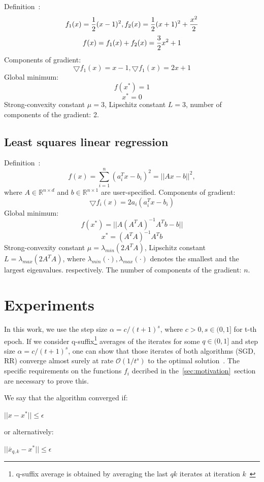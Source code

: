 \documentclass[10pt,conference,compsocconf]{IEEEtran}
\begin{document}
\noindent Definition~\cite{COMPONENTFUNCTION}:
$$f_1(x) = {1 \over 2}(x-1)^2, f_2(x) = {1 \over 2}(x+1)^2 + {x^2 \over 2}$$
$$f(x) = f_1(x) + f_2(x) = {3 \over 2} x^2 + 1$$
Components of gradient:
$$\bigtriangledown f_1(x) = x - 1, \bigtriangledown f_1(x) = 2x + 1$$
Global minimum:
$$f(x^*) = 1$$
$$x^* = 0$$
Strong-convexity constant $\mu = 3$, Lipschitz constant \mbox{$L=3$},
number of components of the gradient: 2.

\subsection{Least squares linear regression}

\noindent Definition~\cite{REGRESSION}:
$$f(x) = \sum_{i=1}^n (a_i^T x-b_i)^2 = ||Ax-b||^2,$$
\noindent where $A \in \mathbb{R}^{n \times d}$ and $b \in \mathbb{R}^{n
\times 1}$ are user-specified.
Components of gradient:
$$\bigtriangledown f_i(x) = 2 a_i(a_i^T x - b_i)$$
Global minimum:
$$f(x^*) = ||A (A^T A)^{-1} A^T b - b||$$
$$x^* = (A^T A)^{-1} A^T b$$
Strong-convexity constant $\mu = \lambda_{min}(2A^TA)$, Lipschitz constant
\mbox{$L=\lambda_{max}(2A^TA)$}, where $\lambda_{min}(\cdot),
\lambda_{max}(\cdot)$ denotes the smallest and the largest
eigenvalues. respectively. The number of components of the gradient: $n$.


\section{Experiments}


\medskip

In this work, we use the step size $\alpha = c / (t+1)^s$, where $c>0, s \in
(0, 1]$ for t-th epoch. If we consider q-suffix\footnote{q-suffix
average is obtained by averaging the last $qk$ iterates at iteration
$k$~\cite{COMPONENTFUNCTION}} averages of the iterates for some $q \in (0,1]$
and step size $\alpha = c / (t+1)^s$, one can show that those iterates
of both algorithms (SGD, RR) converge almost surely  at rate
$\mathcal{O}(1 / t^s)$ to the optimal solution~\cite{COMPONENTFUNCTION}.
The specific requirements on the functions $f_i$ decribed in
the~\ref{sec:motivation}~section are necessary to prove this.

We say that the algorithm converged if:

\centerline{$||x - x^{*}|| \leq \epsilon$}

\noindent or alternatively:

\centerline{$||\overline{x}_{q,k} - x^{*}|| \leq \epsilon$}
\end{document}
